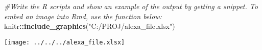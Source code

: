 \documentclass[
]{article}
\newenvironment{Shaded}{\begin{snugshade}}{\end{snugshade}}
\newcommand{\CommentTok}[1]{\textcolor[rgb]{0.56,0.35,0.01}{\textit{#1}}}
\newcommand{\FunctionTok}[1]{\textcolor[rgb]{0.13,0.29,0.53}{\textbf{#1}}}
\newcommand{\NormalTok}[1]{#1}
\newcommand{\SpecialCharTok}[1]{\textcolor[rgb]{0.81,0.36,0.00}{\textbf{#1}}}
\newcommand{\StringTok}[1]{\textcolor[rgb]{0.31,0.60,0.02}{#1}}
\begin{document}
\begin{Shaded}
\begin{Highlighting}[]
\CommentTok{\#Write the R scripts and show an example of the output by getting a snippet. To embed an image into Rmd, use the function below:}
\NormalTok{knitr}\SpecialCharTok{::}\FunctionTok{include\_graphics}\NormalTok{(}\StringTok{"C:/PROJ/alexa\_file.xlsx"}\NormalTok{)}
\end{Highlighting}
\end{Shaded}

\texttt{[image: ../../../alexa\_file.xlsx]}
\end{document}
